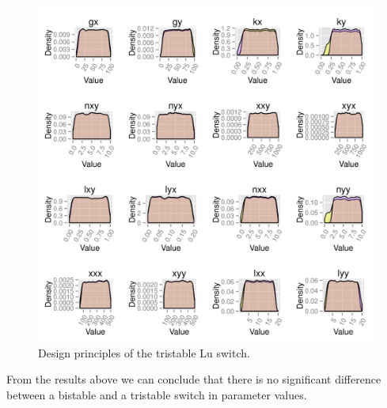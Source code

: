 \begin{figure}[h]
\centering
\includegraphics[scale=0.2]{chapterStabilityFinder/Lu_switches/images/double_pos/design_principles_bi_tri.png}
\caption{Design principles of the tristable Lu switch.}
\label{fig:design_princip_lu}
\end{figure}

From the results above we can conclude that there is no significant difference between a bistable and a tristable switch in parameter values. 

